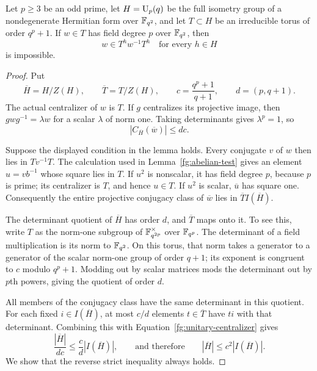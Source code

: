 \begin{lemma}\label{fg:unitary-count}
Let $p\ge3$ be an odd prime, let $H=\operatorname{U}_p(q)$ be the full isometry
group of a nondegenerate Hermitian form over $\mathbb F_{q^2}$, and let
$T\subset H$ be an irreducible torus of order $q^p+1$. If $w\in T$
has field degree $p$ over $\mathbb F_{q^2}$, then
\[
 w\in T^h w^{-1}T^h\quad\text{for every }h\in H
\]
is impossible.
\end{lemma}
\begin{proof}
Put
\[
 \overline H=H/Z(H),\qquad \overline T=T/Z(H),\qquad
 c=\frac{q^p+1}{q+1},\qquad d=(p,q+1).
\]
The actual centralizer of $w$ is $T$. If $g$ centralizes its projective
image, then $gwg^{-1}=\lambda w$ for a scalar $\lambda$ of norm one.
Taking determinants gives $\lambda^p=1$, so
\begin{equation}\label{fg:unitary-centralizer}
 |C_{\overline H}(\overline w)|\le dc.
\end{equation}

Suppose the displayed condition in the lemma holds. Every conjugate
$v$ of $w$ then lies in $Tv^{-1}T$. The calculation used in
Lemma~\ref{fg:abelian-test} gives an element $u=v b^{-1}$ whose
square lies in $T$. If $u^2$ is nonscalar, it has field degree $p$,
because $p$ is prime; its centralizer is $T$, and hence $u\in T$.
If $u^2$ is scalar, $\overline u$ has square one. Consequently the
entire projective conjugacy class of $\overline w$ lies in
$\overline T I(\overline H)$.

The determinant quotient of $\overline H$ has order $d$, and
$\overline T$ maps onto it. To see this, write $T$ as the norm-one
subgroup of $\mathbb F_{q^{2p}}^\times$ over $\mathbb F_{q^p}$. The determinant
of a field multiplication is its norm to $\mathbb F_{q^2}$. On this torus,
that norm takes a generator to a generator of the scalar norm-one
group of order $q+1$; its exponent is congruent to $c$ modulo
$q^p+1$. Modding out by scalar matrices mods the determinant out by
$p$th powers, giving the quotient of order $d$.

All members of the conjugacy class have the same determinant in this
quotient. For each fixed $i\in I(\overline H)$, at most $c/d$ elements
$t\in\overline T$ have $ti$ with that determinant. Combining this
with Equation~\eqref{fg:unitary-centralizer} gives
\[
 \frac{|\overline H|}{dc}
 \le \frac c d |I(\overline H)|,
 \qquad\text{and therefore}\qquad
 |\overline H|\le c^2|I(\overline H)|.
\]
We show that the reverse strict inequality always holds.


\end{proof}
